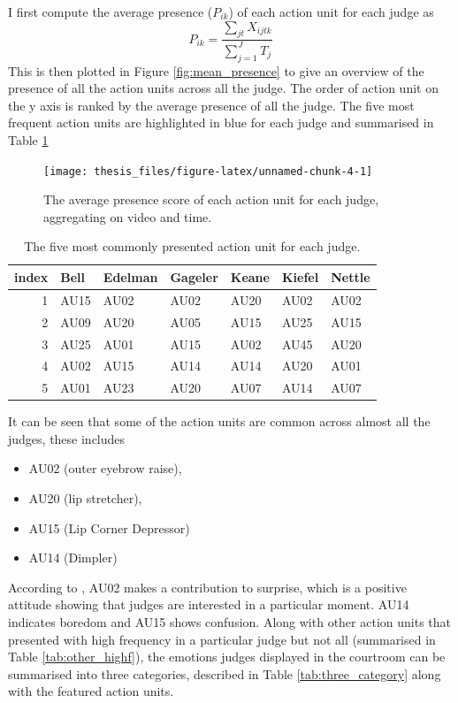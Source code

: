 \documentclass{monashthesis}
\begin{document}
I first compute the average presence (\(P_{ik}\)) of each action unit for each judge as \[P_{ik} = \frac{\sum_{jt}X_{ijtk}}{\sum_{j = 1}^JT_j}\] This is then plotted in Figure \ref{fig:mean_presence} to give an overview of the presence of all the action units across all the judge. The order of action unit on the y axis is ranked by the average presence of all the judge. The five most frequent action units are highlighted in blue for each judge and summarised in Table \ref{tab:most_common}

\begin{figure}
\texttt{[image: thesis\_files/figure-latex/unnamed-chunk-4-1]} \caption{The average presence score of each action unit for each judge, aggregating on video and time. \label{fig:mean_presence}}\label{fig:unnamed-chunk-4}
\end{figure}

\begin{table}[t]

\caption{\label{tab:unnamed-chunk-5}\label{tab:most_common}The five most commonly presented action unit for each judge.}
\centering
\begin{tabular}{r|l|l|l|l|l|l}
\hline
index & Bell & Edelman & Gageler & Keane & Kiefel & Nettle\\
\hline
1 & AU15 & AU02 & AU02 & AU20 & AU02 & AU02\\
\hline
2 & AU09 & AU20 & AU05 & AU15 & AU25 & AU15\\
\hline
3 & AU25 & AU01 & AU15 & AU02 & AU45 & AU20\\
\hline
4 & AU02 & AU15 & AU14 & AU14 & AU20 & AU01\\
\hline
5 & AU01 & AU23 & AU20 & AU07 & AU14 & AU07\\
\hline
\end{tabular}
\end{table}

It can be seen that some of the action units are common across almost all the judges, these includes

\begin{itemize}
\tightlist
\item
  AU02 (outer eyebrow raise),
\item
  AU20 (lip stretcher),
\item
  AU15 (Lip Corner Depressor)
\item
  AU14 (Dimpler)
\end{itemize}

According to \textcite{ekman2002facial}, AU02 makes a contribution to surprise, which is a positive attitude showing that judges are interested in a particular moment. AU14 indicates boredom and AU15 shows confusion. Along with other action units that presented with high frequency in a particular judge but not all (summarised in Table \ref{tab:other_highf}), the emotions judges displayed in the courtroom can be summarised into three categories, described in Table \ref{tab:three_category} along with the featured action units.
\end{document}

